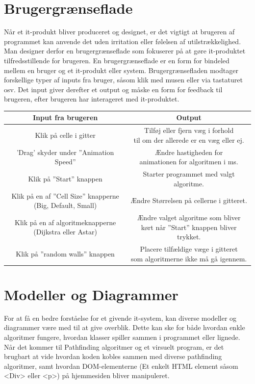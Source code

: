 \documentclass[12pt]{article}
\begin{document}
\section{Brugergrænseflade}
Når et it-produkt bliver produceret og designet, er det vigtigt at brugeren af programmet kan anvende det uden irritation eller følelsen af utilstrækkelighed. Man designer derfor en brugergrænseflade som fokuserer på at gøre it-produktet tilfredsstillende for brugeren.
En brugergrænseflade er en form for bindeled mellem en bruger og et it-produkt eller system. Brugergrænsefladen modtager forskellige typer af inputs fra bruger, såsom klik med musen eller via tastaturet osv. Det input giver derefter et output og måske en form for feedback til brugeren, efter brugeren har interageret med it-produktet. 
\begin{table}[ht]
  \centering
  {\renewcommand{\arraystretch}{2.5} %
  \begin{tabular}{ |c|c| }
   \hline
   \textbf{Input fra brugeren} & \textbf{Output} \\ 
   \hline
   Klik på celle i gitter & \shortstack{Tilføj eller fjern væg i forhold \\ til om der allerede er en væg eller ej.} \\
   \hline
   ’Drag’ skyder under ”Animation Speed” & \shortstack{Ændre hastigheden for \\ animationen for algoritmen i ms.} \\
   \hline
   Klik på ”Start” knappen & Starter programmet med valgt algoritme. \\
   \hline
   \shortstack{Klik på en af ”Cell Size” knapperne \\(Big, Default, Small)} & Ændre Størrelsen på cellerne i gitteret. \\
   \hline
   \shortstack{Klik på en af algoritmeknapperne \\ (Dijkstra eller Astar)} & \shortstack{Ændre valget algoritme som bliver \\kørt når ”Start” knappen bliver trykket.} \\
   \hline
   Klik på ”random walls” knappen & \shortstack{Placere tilfældige væge i gitteret \\ som algoritmerne ikke må gå igennem.} \\
   \hline
  \end{tabular}}
\end{table}
\section{Modeller og Diagrammer}
For at få en bedre forståelse for et givende it-system, kan diverse modeller og diagrammer være med til at give overblik. 
Dette kan ske for både hvordan enkle algoritmer fungere, hvordan klasser spiller sammen i programmet eller lignede. Når det kommer til Pathfinding algoritmer og et virsuelt program, 
er det brugbart at vide 
hvordan koden kobles sammen med diverse pathfinding algoritmer, samt hvordan DOM-elementerne (Et enkelt HTML element såsom <Div> eller <p>) på hjemmesiden bliver manipuleret. 
\newpage
\end{document}

